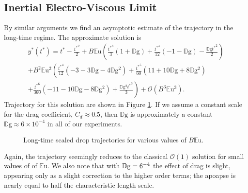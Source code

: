 \documentclass[12pt,a4paper,oneside]{book}
\begin{document}
\subsection{Inertial Electro-Viscous Limit}
By similar arguments we find an asymptotic estimate of the trajectory in the long-time regime. The approximate solution is 
\begin{eqnarray*}
\label{perturb_viscous}
&{y^*}({t^*}) = {t^*} - \frac{{t^*}^{2}}{2} + B\mathbb{E}\mbox{u} \left(\frac{{t^*}^{3}}{3} \left(1 + \mathbb{D}\mbox{g}\right) + \frac{{t^*}^{4}}{12} \left(-1 - \mathbb{D}\mbox{g}\right) - \frac{\mathbb{D}\mbox{g} {t^*}^{2}}{2}\right)&  \\
&+ B^2\mathbb{E}\mbox{u}^{2} \left(\frac{{t^*}^{4}}{12} \left(-3 - 3 \mathbb{D}\mbox{g} - 4 \mathbb{D}\mbox{g}^{2}\right) + \frac{{t^*}^{5}}{60} \left(11 + 10 \mathbb{D}\mbox{g} + 8 \mathbb{D}\mbox{g}^{2}\right) \right. & \\
&\left. + \frac{{t^*}^{6}}{360} \left(-11 - 10 \mathbb{D}\mbox{g} - 8 \mathbb{D}\mbox{g}^{2}\right) + \frac{\mathbb{D}\mbox{g}^{2} {t^*}^{3}}{3}\right)
 + \mathcal{O}(B^3\mathbb{E}\mbox{u}^3).& \nonumber
\end{eqnarray*}
Trajectory for this solution are shown in Figure \ref{fig:long_times}. If we assume a constant scale for the drag coefficient, $C_d \approx 0.5$, then $\mathbb{D}\mbox{g}$ is approximately a constant $\mathbb{D}\mbox{g} \approx 6 \times 10^{-4}$ in all of our experiments.
\begin{figure}[htb]
    \centering
    
    \caption{Long-time scaled drop trajectories for various values of $B \mathbb{E}\mbox{u}$.}
     \label{fig:long_times}
\end{figure}
Again, the trajectory seemingly reduces to the classical $\mathcal{O}(1)$ solution for small values of of $\mathbb{E}\mbox{u}$. We also note that with $\mathbb{D}\mbox{g} = 6 \time 10^{-4}$ the effect of drag is slight, appearing only as a slight correction to the higher order terms; the apoapse is nearly equal to half the characteristic length scale.
 
\end{document}
